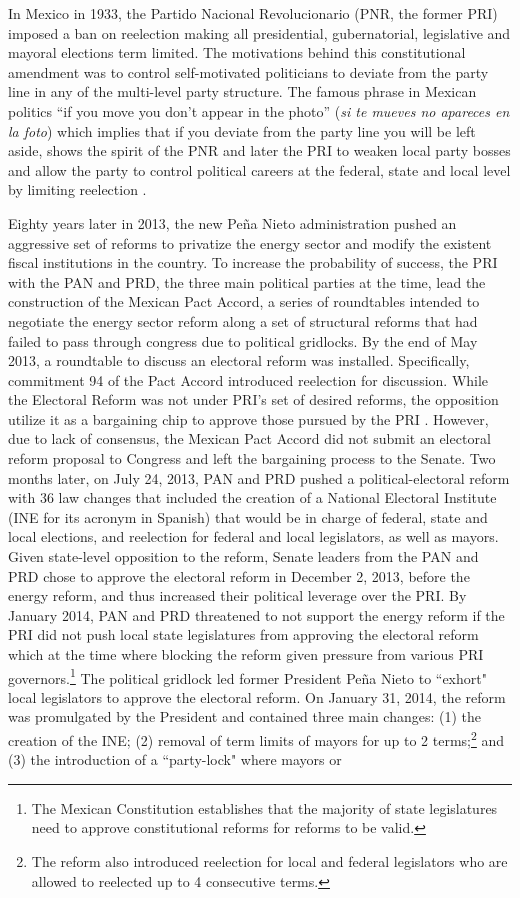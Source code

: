 In Mexico in 1933, the Partido Nacional Revolucionario (PNR, the former PRI) imposed a ban on reelection making all presidential, gubernatorial, legislative and mayoral elections term limited. The motivations behind this constitutional amendment was to control self-motivated politicians to deviate from the party line in any of the multi-level party structure. The famous phrase in Mexican politics ``if you move you don't appear in the photo'' (\emph{si te mueves no apareces en la foto}) which implies that if you deviate from the party line you will be left aside, shows the spirit of the PNR and later the PRI to weaken  local party bosses and allow the party to control political careers at the federal, state and local level by limiting reelection \citep{weldon_2003}. 

Eighty years later in 2013, the new Peña Nieto administration pushed an aggressive set of reforms to privatize the energy sector and modify the existent fiscal institutions in the country. To increase the probability of success, the PRI with the PAN and PRD, the three main political parties at the time, lead the construction of the Mexican Pact Accord, a series of roundtables intended to negotiate the energy sector reform along a set of structural reforms that had failed to pass through congress due to political gridlocks. By the end of May 2013, a roundtable to discuss an electoral reform was installed. Specifically, commitment 94 of the Pact Accord introduced reelection for discussion. While the Electoral Reform was not under PRI's set of desired reforms, the opposition utilize it as a bargaining chip to approve those pursued by the PRI \citep{zamitiz_2017}. However, due to lack of consensus, the Mexican Pact Accord did not submit an electoral reform proposal to Congress and left the bargaining process to the Senate. Two months later, on July 24, 2013, PAN and PRD pushed a political-electoral reform with 36 law changes that included  the creation of a National Electoral Institute (INE for its acronym in Spanish) that would be in charge of federal, state and local elections, and reelection for federal and local legislators, as well as mayors. Given state-level opposition to the reform, Senate leaders from the PAN and PRD chose to approve the electoral reform in December 2, 2013, before the energy reform, and thus increased their political leverage over the PRI. By January 2014, PAN and PRD threatened to not support the energy reform  if the PRI did not push local state legislatures from approving the electoral reform which at the time where blocking the reform given pressure from various PRI governors.\footnote{The Mexican Constitution establishes that the majority of state legislatures need to approve constitutional reforms for reforms to be valid.} The political gridlock led former President Peña Nieto to ``exhort" local legislators to approve the electoral reform. On January 31, 2014, the reform was promulgated by the President and contained three main changes: (1) the creation of the INE; (2) removal of term limits of mayors for up to 2 terms;\footnote{The reform also introduced reelection for local and federal legislators who are allowed to reelected up to 4 consecutive terms.} and (3) the introduction of a ``party-lock"	where mayors or 